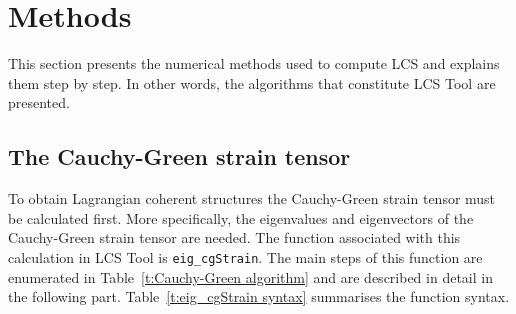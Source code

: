 \documentclass{article}
\begin{document}
%

\clearpage

\section{Methods}

This section presents the numerical methods used to compute LCS and explains them step by step. In other words, the algorithms that constitute LCS Tool are presented.

\subsection{The Cauchy-Green strain tensor}

To obtain Lagrangian coherent structures the Cauchy-Green strain tensor must be calculated first. More specifically, the eigenvalues and eigenvectors of the Cauchy-Green strain tensor are needed. The function associated with this calculation in LCS Tool is \lstinline!eig_cgStrain!. The main steps of this function are enumerated in Table~\ref{t:Cauchy-Green algorithm} and are described in detail in the following part. Table~\ref{t:eig_cgStrain syntax} summarises the function syntax.
\end{document}
